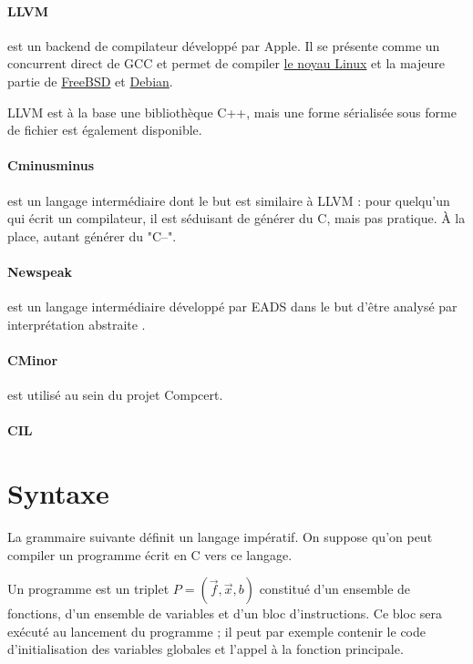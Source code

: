 \documentclass{article}
\begin{document}
\paragraph{LLVM}\cite{llvm-pres} est un backend de compilateur développé par
Apple. Il se présente comme un concurrent direct de GCC et permet de compiler
\href{http://lwn.net/Articles/411654/}{le noyau Linux} et la majeure partie de
\href{http://lists.freebsd.org/pipermail/freebsd-current/2009-February/003743.html}{FreeBSD}
et \href{http://lwn.net/Articles/485301/}{Debian}.

LLVM est à la base une bibliothèque C++, mais une forme sérialisée sous forme
de fichier est également disponible.

\paragraph{Cminusminus}\cite{spjcmm} est un langage intermédiaire dont le but
est similaire à LLVM : pour quelqu'un qui écrit un compilateur, il est séduisant
de générer du C, mais pas pratique. À la place, autant générer du "C--".

\paragraph{Newspeak}\cite{npkSem} est un langage intermédiaire développé par
EADS dans le but d'être analysé par interprétation abstraite .

\paragraph{CMinor} est utilisé au sein du projet Compcert.

\paragraph{CIL}

\section{Syntaxe}

La grammaire suivante définit un langage impératif. On suppose qu'on peut
compiler un programme écrit en C vers ce langage.

Un programme est un triplet $P = (\vec{f}, \vec{x}, b)$ constitué d'un ensemble
de fonctions, d'un ensemble de variables et d'un bloc d'instructions. Ce bloc
sera exécuté au lancement du programme ; il peut par exemple contenir le code
d'initialisation des variables globales et l'appel à la fonction principale.
\end{document}
